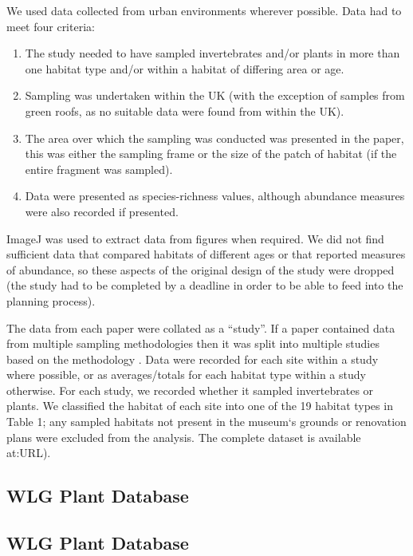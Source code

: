 We used data collected from urban environments wherever possible. Data had to meet four criteria:
\begin{enumerate}
\item The study needed to have sampled invertebrates and/or plants in more than one habitat type and/or within a habitat of differing area or age.
\item Sampling was undertaken within the UK (with the exception of samples from green roofs, as no suitable data were found from within the UK).
\item The area over which the sampling was conducted was presented in the paper, this was either the sampling frame or the size of the patch of habitat (if the entire fragment was sampled). 
\item Data were presented as species-richness values, although abundance measures were also recorded if presented.
\end{enumerate}
ImageJ \cite{schindelin:2012fiji} was used to extract data from figures when required. We did not find sufficient data that compared habitats of different ages or that reported measures of abundance, so these aspects of the original design of the study were dropped (the study had to be completed by a deadline in order to be able to feed into the planning process).

The data from each paper were collated as a ``study''. If a paper contained data from multiple sampling methodologies then it was split into multiple studies based on the methodology \citep[following][]{Hudson:2014predicts}. Data were recorded for each site within a study where possible, or as averages/totals for each habitat type within a study otherwise. For each study, we recorded whether it sampled invertebrates or plants. We classified the habitat of each site into one of the 19 habitat types in Table 1; any sampled habitats not present in the museum`s grounds or renovation plans were excluded from the analysis. The complete dataset is available at:URL).

\ifappendixStyle %
\subsection{WLG Plant Database}%
\else
\subsection*{WLG Plant Database}
\fi

